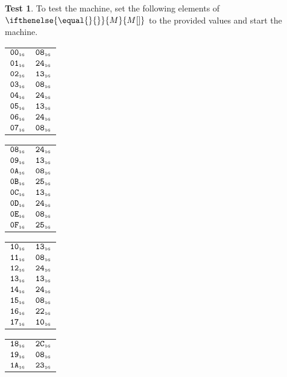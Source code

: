 \documentclass[a4paper,12pt]{article}
\makeatletter
\newcommand{\num}[1]{\texttt{#1}}
\newcommand{\hex}[1]{\num{#1}_{\textup{\tiny 16}}}
\newcommand{\MEM}[1]{\ifthenelse{\equal{#1}{}}{M}{M[#1]}}
\theoremstyle{definition}
\newtheorem{test}{Test}
\newenvironment{memtable}{%
  \begin{trivlist}
    \item
    }{%
    \end{trivlist}}
\newenvironment{memcolumn}{%
  \begin{tabular}{@{}ll@{}}
    \hline}
    {%
    \hline
  \end{tabular}}
\newcommand{\memspace}{\qquad}
\makeatother
\begin{document}
\begin{test}
  To test the machine, set the following elements of $\MEM{}$ to the provided values and start the machine.
  \begin{memtable}
    \begin{memcolumn}
      $\hex{00}$ & $\hex{08}$ \\
      $\hex{01}$ & $\hex{24}$ \\
      $\hex{02}$ & $\hex{13}$ \\
      $\hex{03}$ & $\hex{08}$ \\
      $\hex{04}$ & $\hex{24}$ \\
      $\hex{05}$ & $\hex{13}$ \\
      $\hex{06}$ & $\hex{24}$ \\
      $\hex{07}$ & $\hex{08}$ \\
    \end{memcolumn}
    \memspace
    \begin{memcolumn}
      $\hex{08}$ & $\hex{24}$ \\
      $\hex{09}$ & $\hex{13}$ \\
      $\hex{0A}$ & $\hex{08}$ \\
      $\hex{0B}$ & $\hex{25}$ \\
      $\hex{0C}$ & $\hex{13}$ \\
      $\hex{0D}$ & $\hex{24}$ \\
      $\hex{0E}$ & $\hex{08}$ \\
      $\hex{0F}$ & $\hex{25}$ \\
    \end{memcolumn}
    \memspace
    \begin{memcolumn}
      $\hex{10}$ & $\hex{13}$ \\
      $\hex{11}$ & $\hex{08}$ \\
      $\hex{12}$ & $\hex{24}$ \\
      $\hex{13}$ & $\hex{13}$ \\
      $\hex{14}$ & $\hex{24}$ \\
      $\hex{15}$ & $\hex{08}$ \\
      $\hex{16}$ & $\hex{22}$ \\
      $\hex{17}$ & $\hex{10}$ \\
    \end{memcolumn}
    \memspace
    \begin{memcolumn}
      $\hex{18}$ & $\hex{2C}$ \\
      $\hex{19}$ & $\hex{08}$ \\
      $\hex{1A}$ & $\hex{23}$ \\

\end{memcolumn}
\end{memtable}
\end{test}
\end{document}
